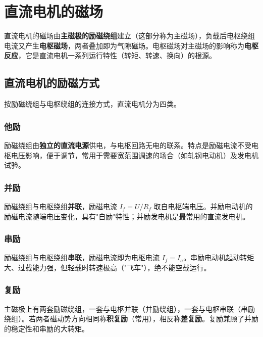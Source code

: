 \chapter{直流电机的磁场}

直流电机的磁场由\textbf{主磁极的励磁绕组}建立（这部分称为主磁场），负载后电枢绕组电流又产生\textbf{电枢磁场}，两者叠加即为气隙磁场。电枢磁场对主磁场的影响称为\textbf{电枢反应}，它是直流电机一系列运行特性（转矩、转速、换向）的根源。

\section{直流电机的励磁方式}

按励磁绕组与电枢绕组的连接方式，直流电机分为四类。

\subsection{他励}
励磁绕组由\textbf{独立的直流电源}供电，与电枢回路无电的联系。特点是励磁电流不受电枢电压影响，便于调节，常用于需要宽范围调速的场合（如轧钢电动机）及发电机试验。

\subsection{并励}
励磁绕组与电枢绕组\textbf{并联}，励磁电流 $I_f=U/R_f$ 取自电枢端电压。并励电动机的励磁电流随端电压变化，具有"自励"特性；并励发电机是最常用的直流发电机。

\subsection{串励}
励磁绕组与电枢绕组\textbf{串联}，励磁电流即为电枢电流 $I_f=I_a$。串励电动机起动转矩大、过载能力强，但轻载时转速极高（"飞车"），绝不能空载运行。

\subsection{复励}
主磁极上有两套励磁绕组，一套与电枢并联（并励绕组），一套与电枢串联（串励绕组）。若两者磁动势方向相同称\textbf{积复励}（常用），相反称\textbf{差复励}。复励兼顾了并励的稳定性和串励的大转矩。

